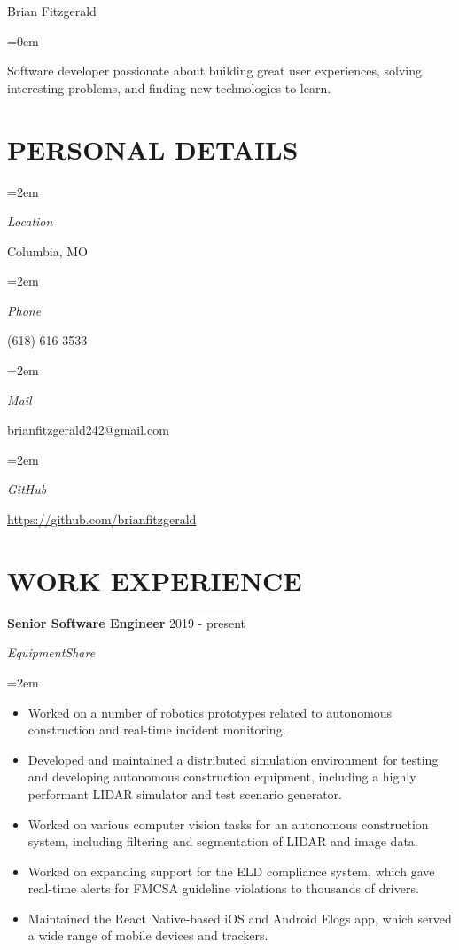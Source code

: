 \documentclass[paper=a4,fontsize=9pt]{scrartcl} %
\newlength{\spacebox}
\newcommand{\sepspace}{\vspace*{0.8em}}		%
\newcommand{\MyName}[1]{ %
			\Huge \usefont{OT1}{phv}{b}{n} \hfill #1
			\par \normalsize \normalfont}
\newcommand{\NewPart}[1]{\section*{\uppercase{#1}}}
\newcommand{\PersonalEntry}[2]{
			\noindent\hangindent=2em\hangafter=0 %
			\parbox{\spacebox}{        %
			\textit{#1}}		       %
			\hspace{1.5em} #2 \par}    %
\newcommand{\PersonalStatement}[2]{
			\noindent\hangindent=0em\hangafter=0 %
			\parbox{\spacebox}{        %
			\textit{#1}}		       %
			\hspace{-5.5em} #2 \par}    %
\newcommand{\EducationEntry}[4]{
			\noindent \textbf{#1} \hfill      %
			\colorbox{Black}{%
				\parbox{6em}{%
				\hfill\color{White}#2}} \par  %
			\noindent \textit{#3} \par        %
			\noindent\hangindent=2em\hangafter=0 \small #4 %
			\normalsize \par}
\newcommand{\WorkEntry}[4]{				  %
			\noindent \textbf{#1} \hfill      %
			\colorbox{White}{\color{Black}#2} \par  %
			\noindent \textit{#3} \par              %
			\noindent\hangindent=2em\hangafter=0 \small #4 %
			\normalsize \par}
\begin{document}
	
	\MyName{Brian Fitzgerald}
	
	\sepspace

	\PersonalStatement{}{Software developer passionate about building great user experiences, solving interesting problems, and finding new technologies to learn.}

	
	\NewPart{Personal details}{}
	
	\PersonalEntry{Location}{Columbia, MO}
	\PersonalEntry{Phone}{(618) 616-3533}
	\PersonalEntry{Mail}{\url{brianfitzgerald242@gmail.com}}
	\PersonalEntry{GitHub}{\url{https://github.com/brianfitzgerald}}
	
	\NewPart{Work experience}{}

	\WorkEntry{Senior Software Engineer}{2019 - present}{EquipmentShare}{
		\begin{itemize}
			\item Worked on a number of robotics prototypes related to autonomous construction and real-time incident monitoring.
			\item Developed and maintained a distributed simulation environment for testing and developing autonomous construction equipment, including a highly performant LIDAR simulator and test scenario generator.
			\item Worked on various computer vision tasks for an autonomous construction system, including filtering and segmentation of LIDAR and image data.
			\item Worked on expanding support for the ELD compliance system, which gave real-time alerts for FMCSA guideline violations to thousands of drivers. 
			\item Maintained the React Native-based iOS and Android Elogs app, which served a wide range of mobile devices and trackers.
		\end{itemize}
	}
	\sepspace
	
\end{document}
